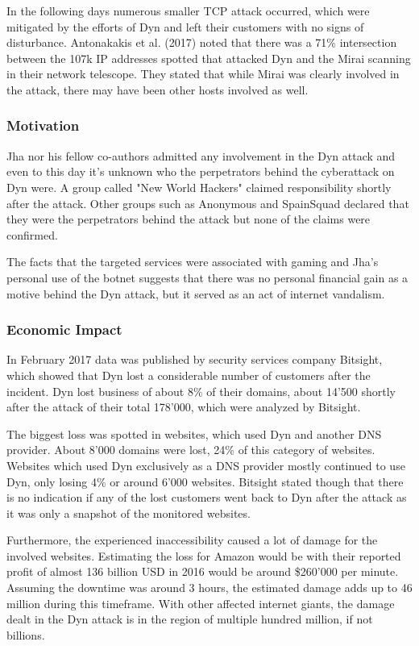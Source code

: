 In the following days numerous smaller TCP attack occurred, which were mitigated by the efforts of Dyn and left their customers with no signs of disturbance. \cite{Dyn16} Antonakakis et al. (2017) noted that there was a 71\% intersection between the 107k IP addresses spotted that attacked Dyn and the Mirai scanning in their network telescope. They stated that while Mirai was clearly involved in the attack, there may have been other hosts involved as well. \cite{Antonakakis17}

		\subsubsection{Motivation}
Jha nor his fellow co-authors admitted any involvement in the Dyn attack and even to this day it's unknown who the perpetrators behind the cyberattack on Dyn were. A group called "New World Hackers" claimed responsibility shortly after the attack. Other groups such as Anonymous and SpainSquad declared that they were the perpetrators behind the attack but none of the claims were confirmed. \cite{Lewis17}

The facts that the targeted services were associated with gaming and Jha's personal use of the botnet suggests that there was no personal financial gain as a motive behind the Dyn attack, but it served as an act of internet vandalism.

	\subsubsection{Economic Impact}
	In February 2017 data was published by security services company Bitsight, which showed that Dyn lost a considerable number of customers after the incident. Dyn lost business of about 8\% of their domains, about 14'500 shortly after the attack of their total 178'000, which were analyzed by Bitsight. \cite{Varghese17}
	
The biggest loss was spotted in websites, which used Dyn and another DNS provider. About 8'000 domains were lost, 24\% of this category of websites. Websites which used Dyn exclusively as a DNS provider mostly continued to use Dyn, only losing 4\% or around 6'000 websites. Bitsight stated though that there is no indication if any of the lost customers went back to Dyn after the attack as it was only a snapshot of the monitored websites. \cite{Varghese17}

Furthermore, the experienced inaccessibility caused a lot of damage for the involved websites. Estimating the loss for Amazon would be with their reported profit of almost 136 billion USD in 2016 \cite{Macrotrends} would be around \$260'000 per minute. Assuming the downtime was around 3 hours, the estimated damage adds up to 46 million during this timeframe. With other affected internet giants, the damage dealt in the Dyn attack is in the region of multiple hundred million, if not billions.

